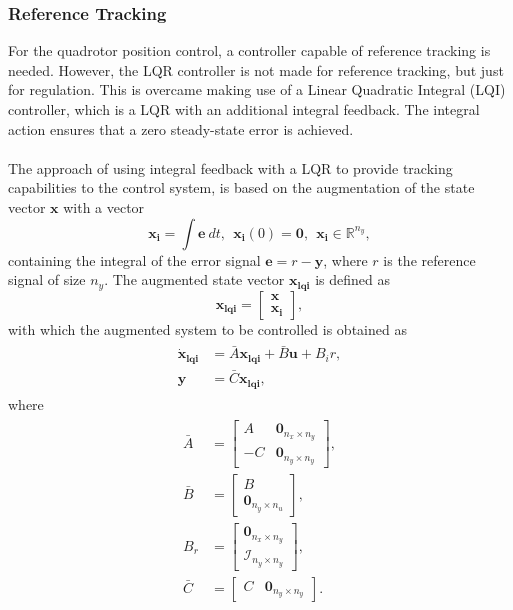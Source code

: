 \subsubsection{Reference Tracking}
For the quadrotor position control, a controller capable of reference tracking is needed. However, the LQR controller is not made for reference tracking, but just for regulation. This is overcame making use of a Linear Quadratic Integral (LQI) controller, which is a LQR with an additional integral feedback. The integral action ensures that a zero steady-state error is achieved. 
\\\\
The approach of using integral feedback with a LQR to provide tracking capabilities to the control system, is based on the augmentation of the state vector $\mathbf{x}$ with a vector
\begin{equation}
\mathbf{x_i} = \int \mathbf{e}\ dt,\ \ \mathbf{x_i}(0) = \mathbf{0},\ \ \mathbf{x_i} \in \mathbb{R}^{n_y},
\end{equation}
containing the integral of the error signal $\mathbf{e} = r - \mathbf{y}$, where $r$ is the reference signal of size $n_y$. The augmented state vector $\mathbf{x_{lqi}}$ is defined as
\begin{equation}
\mathbf{x_{lqi}} = \begin{bmatrix}
\mathbf{x} \\
\mathbf{x_i}
\end{bmatrix},
\end{equation}
with which the augmented system to be controlled is obtained as
\begin{align}
\label{eqn:augmentedLQI}
\begin{split}
\mathbf{\dot{x}_{lqi}} & = \bar{A}\mathbf{x_{lqi}} + \bar{B}\mathbf{u} + B_{i}r,\\[5px]
\mathbf{y} & = \bar{C}\mathbf{x_{lqi}},
\end{split}
\end{align}
where
\begin{align}
\begin{split}
\bar{A} & = \begin{bmatrix}
A & \mathbf{0_{\mathit{n_x}\times \mathit{n_y}}} \\
-C & \mathbf{0_{\mathit{n_y}\times \mathit{n_y}}}
\end{bmatrix}, \\[5px]
\bar{B} & = \begin{bmatrix}
B \\ \mathbf{0_{\mathit{n_y}\times \mathit{n_u}}}
\end{bmatrix}, \\[5px]
B_{r} & = \begin{bmatrix}
\mathbf{0_{\mathit{n_x}\times \mathit{n_y}}} \\
\mathcal{I}_{\mathit{n_y}\times \mathit{n_y}}
\end{bmatrix}, \\[5px]
\bar{C} & = \begin{bmatrix}
C & \mathbf{0_{\mathit{n_y}\times \mathit{n_y}}}
\end{bmatrix}.
\end{split}
\end{align}
